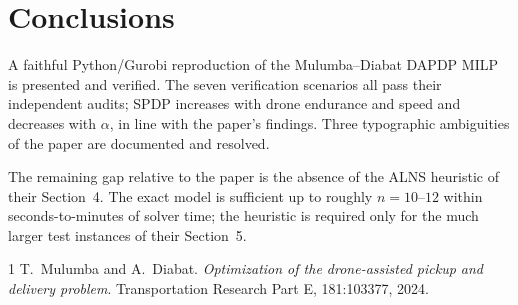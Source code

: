 \documentclass[11pt,a4paper]{article}
\newcommand{\dapdp}{\textsc{DAPDP}}
\begin{document}
\section{Conclusions}

A faithful Python/Gurobi reproduction of the Mulumba--Diabat \dapdp{} MILP
is presented and verified. The seven verification scenarios all pass
their independent audits; SPDP increases with drone endurance and speed
and decreases with $\alpha$, in line with the paper's findings. Three
typographic ambiguities of the paper are documented and resolved.

The remaining gap relative to the paper is the absence of the ALNS
heuristic of their Section~4. The exact model is sufficient up to roughly
$n{=}10$--$12$ within seconds-to-minutes of solver time; the heuristic is
required only for the much larger test instances of their Section~5.

\begin{thebibliography}{1}
T.~Mulumba and A.~Diabat. \emph{Optimization of the drone-assisted pickup
and delivery problem}. Transportation Research Part E, 181:103377, 2024.
\end{thebibliography}
\end{document}
